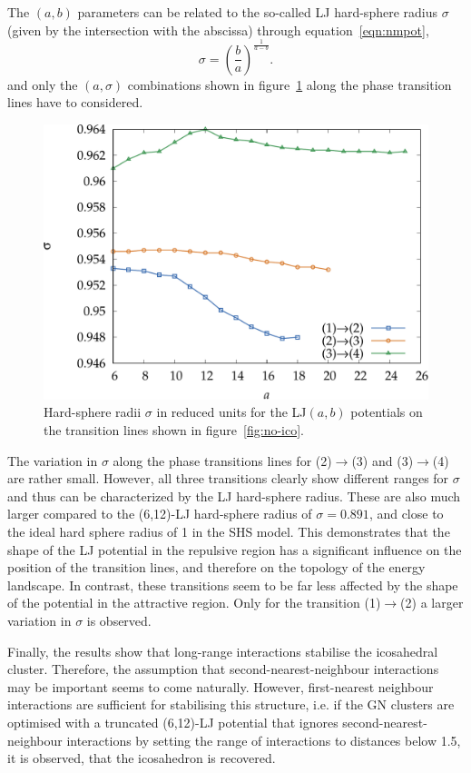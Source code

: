 The $(a,b)$ parameters can be related to the so-called \ac{LJ} hard-sphere radius
$\sigma$ (given by the intersection with the abscissa) through
equation~\eqref{eqn:nmpot},
%
\begin{equation}
    \sigma=\left(\frac{b}{a}\right)^{\frac{1}{a-b}}.
\end{equation}
%
and only the $(a,\sigma)$ combinations shown in figure~\ref{fig:hardsphere}
along the phase transition lines have to considered.
%
\begin{figure}[htb]\centering
    \includegraphics[width=.8\columnwidth]{gregory-newton/sigma.pdf}
    \caption{Hard-sphere radii $\sigma$ in reduced units for the LJ$(a,b)$
    potentials on the transition lines shown in figure~\ref{fig:no-ico}.}
    \label{fig:hardsphere}
\end{figure}

The variation in $\sigma$ along the phase transitions lines for
(2)$\rightarrow$(3) and (3)$\rightarrow$(4) are rather small. However, all three
transitions clearly show different ranges for $\sigma$ and thus can be
characterized by the \ac{LJ} hard-sphere radius. These are also much larger
compared to the (6,12)-\ac{LJ} hard-sphere radius of $\sigma=0.891$, and close
to the ideal hard sphere radius of 1 in the \ac{SHS} model. This demonstrates
that the shape of the \ac{LJ} potential in the repulsive region has a
significant influence on the position of the transition lines, and therefore on
the topology of the energy landscape. In contrast, these transitions seem to be
far less affected by the shape of the potential in the attractive region. Only
for the transition (1)$\rightarrow$(2) a larger variation in $\sigma$ is
observed.

Finally, the results show that long-range interactions stabilise the icosahedral
cluster. Therefore, the assumption that second-nearest-neighbour interactions
may be important seems to come naturally. However, first-nearest neighbour
interactions are sufficient for stabilising this structure, i.e. if the \ac{GN}
clusters are optimised with a truncated (6,12)-\ac{LJ} potential that ignores
second-nearest-neighbour interactions by setting the range of interactions to
distances below 1.5, it is observed, that the icosahedron is recovered.

